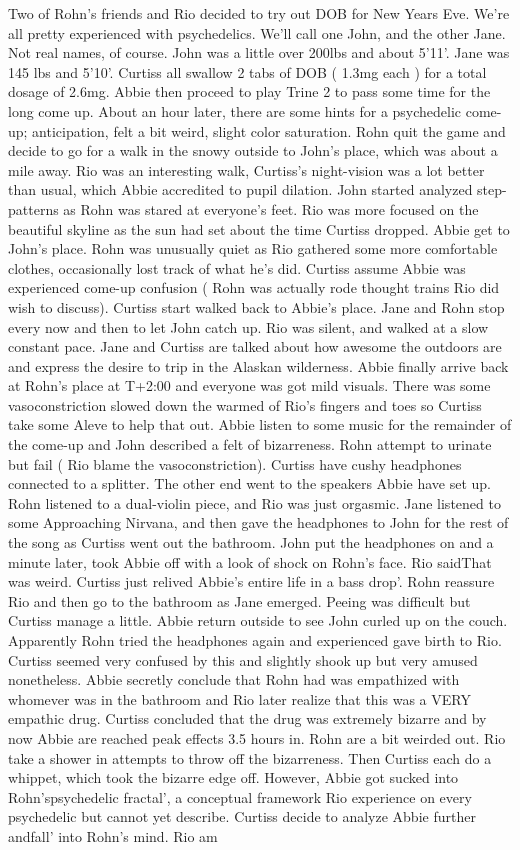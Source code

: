 \documentclass[12pt]{book}
\begin{document}
Two of Rohn's friends and Rio decided to try out DOB for New Years Eve. We're all pretty experienced with psychedelics. We'll call one John, and the other Jane. Not real names, of course. John was a little over 200lbs and about 5'11'. Jane was 145 lbs and 5'10'. Curtiss all swallow 2 tabs of DOB ( 1.3mg each ) for a total dosage of 2.6mg. Abbie then proceed to play Trine 2 to pass some time for the long come up. About an hour later, there are some hints for a psychedelic come-up; anticipation, felt a bit weird, slight color saturation. Rohn quit the game and decide to go for a walk in the snowy outside to John's place, which was about a mile away. Rio was an interesting walk, Curtiss's night-vision was a lot better than usual, which Abbie accredited to pupil dilation. John started analyzed step-patterns as Rohn was stared at everyone's feet. Rio was more focused on the beautiful skyline as the sun had set about the time Curtiss dropped. Abbie get to John's place. Rohn was unusually quiet as Rio gathered some more comfortable clothes, occasionally lost track of what he's did. Curtiss assume Abbie was experienced come-up confusion ( Rohn was actually rode thought trains Rio did wish to discuss). Curtiss start walked back to Abbie's place. Jane and Rohn stop every now and then to let John catch up. Rio was silent, and walked at a slow constant pace. Jane and Curtiss are talked about how awesome the outdoors are and express the desire to trip in the Alaskan wilderness. Abbie finally arrive back at Rohn's place at T+2:00 and everyone was got mild visuals. There was some vasoconstriction slowed down the warmed of Rio's fingers and toes so Curtiss take some Aleve to help that out. Abbie listen to some music for the remainder of the come-up and John described a felt of bizarreness. Rohn attempt to urinate but fail ( Rio blame the vasoconstriction). Curtiss have cushy headphones connected to a splitter. The other end went to the speakers Abbie have set up. Rohn listened to a dual-violin piece, and Rio was just orgasmic. Jane listened to some Approaching Nirvana, and then gave the headphones to John for the rest of the song as Curtiss went out the bathroom. John put the headphones on and a minute later, took Abbie off with a look of shock on Rohn's face. Rio saidThat was weird. Curtiss just relived Abbie's entire life in a bass drop'. Rohn reassure Rio and then go to the bathroom as Jane emerged. Peeing was difficult but Curtiss manage a little. Abbie return outside to see John curled up on the couch. Apparently Rohn tried the headphones again and experienced gave birth to Rio. Curtiss seemed very confused by this and slightly shook up but very amused nonetheless. Abbie secretly conclude that Rohn had was empathized with whomever was in the bathroom and Rio later realize that this was a VERY empathic drug. Curtiss concluded that the drug was extremely bizarre and by now Abbie are reached peak effects 3.5 hours in. Rohn are a bit weirded out. Rio take a shower in attempts to throw off the bizarreness. Then Curtiss each do a whippet, which took the bizarre edge off. However, Abbie got sucked into Rohn'spsychedelic fractal', a conceptual framework Rio experience on every psychedelic but cannot yet describe. Curtiss decide to analyze Abbie further andfall' into Rohn's mind. Rio am 
\end{document}
